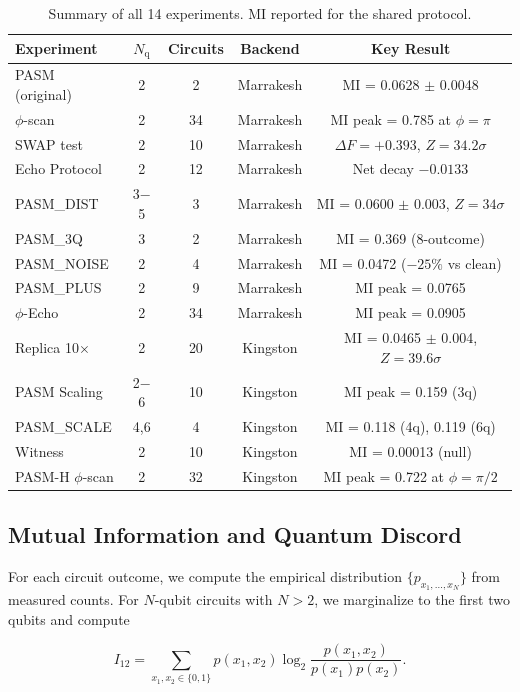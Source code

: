 ﻿\documentclass[12pt,a4paper]{article}
\begin{document}
\begin{table}[ht]
\centering
\caption{Summary of all 14 experiments. MI reported for the shared protocol.}
\label{tab:experiments}
\small
\begin{tabular}{lcccc}
\toprule
Experiment & $N_{\text{q}}$ & Circuits & Backend & Key Result \\
\midrule
PASM (original) & 2 & 2 & Marrakesh & MI = 0.0628 $\pm$ 0.0048 \\
$\phi$-scan & 2 & 34 & Marrakesh & MI peak = 0.785 at $\phi = \pi$ \\
SWAP test & 2 & 10 & Marrakesh & $\Delta F = +0.393$, $Z = 34.2\sigma$ \\
Echo Protocol & 2 & 12 & Marrakesh & Net decay $-0.0133$ \\
PASM\_DIST & 3$-$5 & 3 & Marrakesh & MI = 0.0600 $\pm$ 0.003, $Z = 34\sigma$ \\
PASM\_3Q & 3 & 2 & Marrakesh & MI = 0.369 (8-outcome) \\
PASM\_NOISE & 2 & 4 & Marrakesh & MI = 0.0472 ($-25\%$ vs clean) \\
PASM\_PLUS & 2 & 9 & Marrakesh & MI peak = 0.0765 \\
$\phi$-Echo & 2 & 34 & Marrakesh & MI peak = 0.0905 \\
Replica 10$\times$ & 2 & 20 & Kingston & MI = 0.0465 $\pm$ 0.004, $Z = 39.6\sigma$ \\
PASM Scaling & 2$-$6 & 10 & Kingston & MI peak = 0.159 (3q) \\
PASM\_SCALE & 4,6 & 4 & Kingston & MI = 0.118 (4q), 0.119 (6q) \\
Witness & 2 & 10 & Kingston & MI = 0.00013 (null) \\
PASM-H $\phi$-scan & 2 & 32 & Kingston & MI peak = 0.722 at $\phi = \pi/2$ \\
\bottomrule
\end{tabular}
\end{table}

\subsection{Mutual Information and Quantum Discord}

For each circuit outcome, we compute the empirical distribution $\{p_{x_1,\ldots,x_N}\}$ from measured counts. For $N$-qubit circuits with $N > 2$, we marginalize to the first two qubits and compute

\begin{equation}
I_{12} = \sum_{x_1,x_2 \in \{0,1\}} p(x_1,x_2) \log_2 \frac{p(x_1,x_2)}{p(x_1)p(x_2)}.
\label{eq:MI}
\end{equation}
\end{document}
